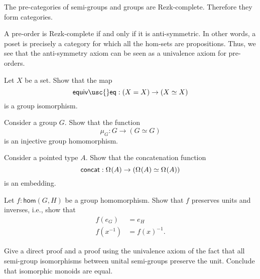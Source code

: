 \begin{eg}
  The pre-categories of semi-groups and groups are Rezk-complete. Therefore they form categories.
\end{eg}

\begin{eg}
  A pre-order is Rezk-complete if and only if it is anti-symmetric. In other words, a poset is precisely a category for which all the hom-sets are propositions. Thus, we see that the anti-symmetry axiom can be seen as a univalence axiom for pre-orders.
\end{eg}

\begin{exercises}
\item Let $X$ be a set. Show that the map
  \begin{equation*}
    \mathsf{equiv\usc{}eq} : (X=X)\to (\eqv{X}{X})
  \end{equation*}
  is a group isomorphism.
\item \label{ex:groupop-embedding}
  \begin{subexenum}
  \item Consider a group $G$. Show that the function
    \begin{equation*}
      \mu_G:G\to (G\simeq G)
    \end{equation*}
    is an injective group homomorphism.
  \item Consider a pointed type $A$. Show that the concatenation function
    \begin{equation*}
      \mathsf{concat}:\Omega^{}(A)\to (\Omega^{}(A)\simeq\Omega^{}(A))
    \end{equation*}
    is an embedding.
  \end{subexenum}
\item Let $f:\mathsf{hom}(G,H)$ be a group homomorphism. Show that $f$ preserves units and inverses, i.e., show that
  \begin{align*}
    f(e_G) & = e_H \\
    f(x^{-1}) & = f(x)^{-1}.
  \end{align*}
\item Give a direct proof and a proof using the univalence axiom of the fact that all semi-group isomorphisms between unital semi-groups preserve the unit. Conclude that isomorphic monoids are equal.

\end{exercises}
